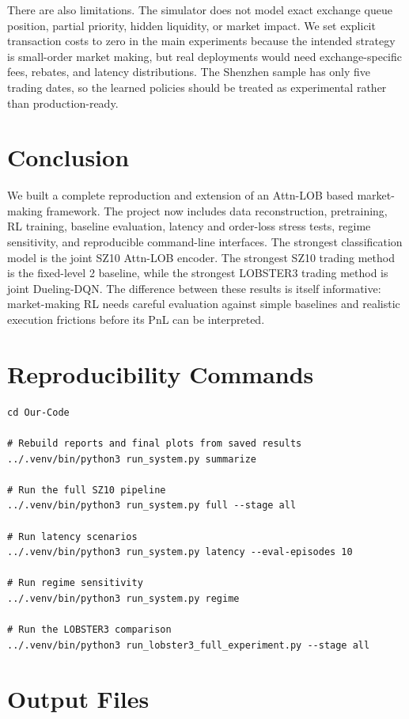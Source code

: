 \documentclass[11pt]{article}
\begin{document}
There are also limitations. The simulator does not model exact exchange queue
position, partial priority, hidden liquidity, or market impact. We set explicit
transaction costs to zero in the main experiments because the intended strategy
is small-order market making, but real deployments would need exchange-specific
fees, rebates, and latency distributions. The Shenzhen sample has only five
trading dates, so the learned policies should be treated as experimental rather
than production-ready.

\section{Conclusion}

We built a complete reproduction and extension of an Attn-LOB based
market-making framework. The project now includes data reconstruction,
pretraining, RL training, baseline evaluation, latency and order-loss stress
tests, regime sensitivity, and reproducible command-line interfaces. The strongest
classification model is the joint SZ10 Attn-LOB encoder. The strongest SZ10
trading method is the fixed-level 2 baseline, while the strongest LOBSTER3
trading method is joint Dueling-DQN. The difference between these results is
itself informative: market-making RL needs careful evaluation against simple
baselines and realistic execution frictions before its PnL can be interpreted.

\appendix
\section{Reproducibility Commands}

\begin{verbatim}
cd Our-Code

# Rebuild reports and final plots from saved results
../.venv/bin/python3 run_system.py summarize

# Run the full SZ10 pipeline
../.venv/bin/python3 run_system.py full --stage all

# Run latency scenarios
../.venv/bin/python3 run_system.py latency --eval-episodes 10

# Run regime sensitivity
../.venv/bin/python3 run_system.py regime

# Run the LOBSTER3 comparison
../.venv/bin/python3 run_lobster3_full_experiment.py --stage all
\end{verbatim}

\section{Output Files}
\end{document}

